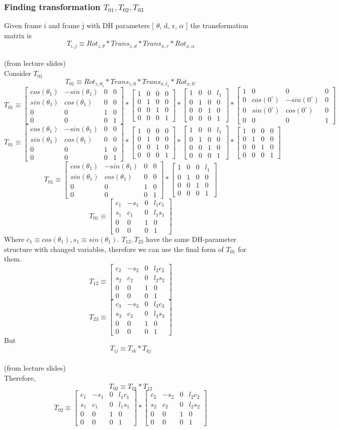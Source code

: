 \documentclass[12pt]{article}
\newcommand{\fromlectures}{{\\ \color{blue} \hspace*{\fill}(from lecture slides)} \\}
\newcommand{\rx}[1]{\begin{bmatrix} 1 & 0 & 0 & 0 \\ 0 & cos(#1) & -sin(#1) & 0 \\ 0 & sin(#1) & cos(#1) & 0 \\ 0 & 0 & 0 & 1 \end{bmatrix}}
\newcommand{\rz}[1]{\begin{bmatrix} cos(#1) & -sin(#1) & 0 & 0 \\ sin(#1) & cos(#1) & 0 & 0 \\ 0 & 0 & 1 & 0 \\ 0 & 0 & 0 & 1 \end{bmatrix}}
\newcommand{\iden}{\begin{bmatrix} 1 & 0 & 0 & 0 \\ 0 & 1 & 0 & 0 \\ 0 & 0 & 1 & 0 \\ 0 & 0 & 0 & 1 \end{bmatrix}}
\newcommand{\trans}[3]{\begin{bmatrix} 1 & 0 & 0 & #1 \\ 0 & 1 & 0 & #2 \\ 0 & 0 & 1 & #3 \\ 0 & 0 & 0 & 1 \end{bmatrix}}
\begin{document}
\subsubsection*{Finding transformation $T_{01}, T_{02}, T_{03}$}
Given frame i and frame j with DH parameters [ $\theta$, d, r, $\alpha$ ] the transformation matrix is
\[
  T_{i,j} \equiv Rot_{z,\theta} * Trans_{z, d} * Trans_{x, r} * Rot_{x, \alpha}
\]
\fromlectures
Consider $T_{01}$
\[
  T_{01} \equiv Rot_{z,\theta_1} * Trans_{z, 0} * Trans_{x, l_1} * Rot_{x, 0^{\circ}}
\]
\[
  T_{01} \equiv \rz{\theta_1} * \trans{0}{0}{0} * \trans{l_1}{0}{0} * \rx{0^{\circ}}
\]
\[
  T_{01} \equiv \rz{\theta_1} * \iden * \trans{l_1}{0}{0} * \iden
\]
\[
  T_{01} \equiv \rz{\theta_1} * \trans{l_1}{0}{0}
\]
\[
  T_{01} \equiv
  \begin{bmatrix} c_1 & -s_1 & 0 & l_1c_1 \\ s_1 & c_1 & 0 & l_1s_1 \\ 0 & 0 & 1 & 0 \\ 0 & 0 & 0 & 1 \end{bmatrix}
\]
Where $c_1 \equiv cos(\theta_1), s_1 \equiv sin(\theta_1)$.
$T_{12}, T_{23}$ have the same DH-parameter structure with changed variables, therefore we can use the final form of $T_{01}$ for them.
\[
  T_{12} \equiv
  \begin{bmatrix} c_2 & -s_2 & 0 & l_2c_2 \\ s_2 & c_2 & 0 & l_2s_2 \\ 0 & 0 & 1 & 0 \\ 0 & 0 & 0 & 1 \end{bmatrix}
\]
\[
  T_{23} \equiv
  \begin{bmatrix} c_3 & -s_3 & 0 & l_3c_3 \\ s_3 & c_3 & 0 & l_3s_3 \\ 0 & 0 & 1 & 0 \\ 0 & 0 & 0 & 1 \end{bmatrix}
\]
But
\[
  T_{ij} \equiv T_{ik} * T_{kj}
\]
\fromlectures
Therefore,
\[
  T_{02} \equiv T_{01} * T_{12}
\]
\[
  T_{02} \equiv
  \begin{bmatrix} c_1 & -s_1 & 0 & l_1c_1 \\ s_1 & c_1 & 0 & l_1s_1 \\ 0 & 0 & 1 & 0 \\ 0 & 0 & 0 & 1 \end{bmatrix}
  *
  \begin{bmatrix} c_2 & -s_2 & 0 & l_2c_2 \\ s_2 & c_2 & 0 & l_2s_2 \\ 0 & 0 & 1 & 0 \\ 0 & 0 & 0 & 1 \end{bmatrix}
\]
\end{document}

